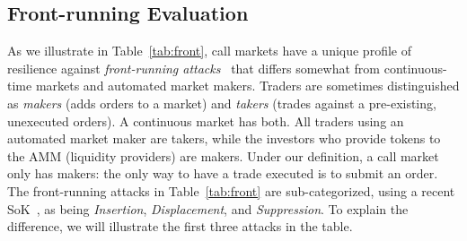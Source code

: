 \subsection{Front-running Evaluation} \label{sec:front}




As we illustrate in Table~\ref{tab:front}, call markets have a unique profile of resilience against \emph{front-running attacks}~\cite{clark2014decentralizing,eskandari2019sok,daian2019flash} that differs somewhat from continuous-time markets and automated market makers. Traders are sometimes distinguished as \emph{makers} (adds orders to a market) and \emph{takers} (trades against a pre-existing, unexecuted orders). A continuous market has both. All traders using an automated market maker are takers, while the investors who provide tokens to the AMM (liquidity providers) are makers. Under our definition, a call market only has makers: the only way to have a trade executed is to submit an order. The front-running attacks in Table~\ref{tab:front} are sub-categorized, using a recent SoK~\cite{eskandari2019sok}, as being \emph{Insertion}, \emph{Displacement}, and \emph{Suppression}. To explain the difference, we will illustrate the first three attacks in the table. 

